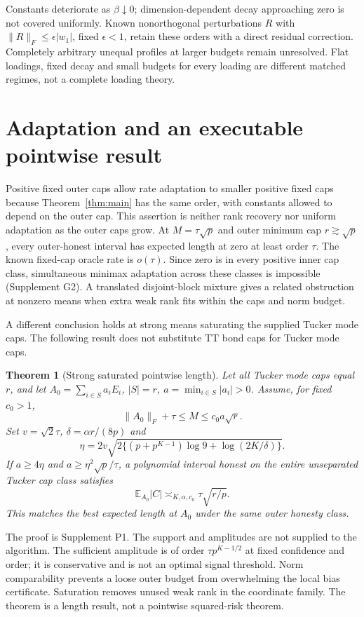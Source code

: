 \documentclass[11pt]{article}
\newtheorem{theorem}{Theorem}
\newcommand{\E}{\mathbb E}
\newcommand{\norm}[1]{\lVert #1\rVert}
\begin{document}
Constants deteriorate as $\beta\downarrow0$; dimension-dependent decay approaching zero is not covered uniformly. Known nonorthogonal perturbations $R$ with $\norm R_F\le\epsilon|w_1|$, fixed $\epsilon<1$, retain these orders with a direct residual correction. Completely arbitrary unequal profiles at larger budgets remain unresolved. Flat loadings, fixed decay and small budgets for every loading are different matched regimes, not a complete loading theory.

\section{Adaptation and an executable pointwise result}\label{sec:pointwise}
Positive fixed outer caps allow rate adaptation to smaller positive fixed caps because Theorem~\ref{thm:main} has the same order, with constants allowed to depend on the outer cap. This assertion is neither rank recovery nor uniform adaptation as the outer caps grow. At $M=\tau\sqrt p$ and outer minimum cap $r\gtrsim\sqrt p$, every outer-honest interval has expected length at zero at least order $\tau$. The known fixed-cap oracle rate is $o(\tau)$. Since zero is in every positive inner cap class, simultaneous minimax adaptation across these classes is impossible (Supplement G2). A translated disjoint-block mixture gives a related obstruction at nonzero means when extra weak rank fits within the caps and norm budget.

A different conclusion holds at strong means saturating the supplied Tucker mode caps. The following result does not substitute TT bond caps for Tucker mode caps.
\begin{theorem}[Strong saturated pointwise length]\label{thm:pointwise}
Let all Tucker mode caps equal $r$, and let
$A_0=\sum_{i\in S}a_iE_i$, $|S|=r$, $a=\min_{i\in S}|a_i|>0$.
Assume, for fixed $c_0>1$,
\[
 \norm{A_0}_F+\tau\le M\le c_0a\sqrt r.
\]
Set $v=\sqrt2\tau$, $\delta=\alpha r/(8p)$ and
\[
 \eta=2v\sqrt{2\{(p+p^{K-1})\log9+\log(2K/\delta)\}}.
\]
If $a\ge4\eta$ and $a\ge\eta^2\sqrt p/\tau$, a polynomial interval honest on the entire unseparated Tucker cap class satisfies
\[
 \E_{A_0}|C|\asymp_{K,\alpha,c_0}\tau\sqrt{r/p}.
\]
This matches the best expected length at $A_0$ under the same outer honesty class.
\end{theorem}
The proof is Supplement P1. The support and amplitudes are not supplied to the algorithm. The sufficient amplitude is of order $\tau p^{K-1/2}$ at fixed confidence and order; it is conservative and is not an optimal signal threshold. Norm comparability prevents a loose outer budget from overwhelming the local bias certificate. Saturation removes unused weak rank in the coordinate family. The theorem is a length result, not a pointwise squared-risk theorem.
\end{document}
